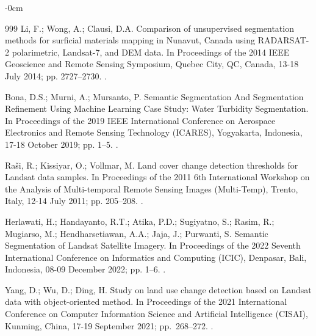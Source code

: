 \documentclass[analytics,article,accept,pdftex,moreauthors]{Definitions/mdpi}
\begin{document}
\begin{adjustwidth}{-\extralength}{0cm}
\begin{thebibliography}{999}
Li, F.; Wong, A.; Clausi, D.A.
\newblock Comparison of unsupervised segmentation methods for surficial
  materials mapping in Nunavut, Canada using RADARSAT-2 polarimetric,
  Landsat-7, and DEM data.
\newblock In Proceedings of the 2014 IEEE Geoscience and Remote Sensing
  Symposium, Quebec City, QC, Canada, 13-18 July 2014; pp. 2727--2730.  %
.

Bona, D.S.; Murni, A.; Mursanto, P.
\newblock Semantic Segmentation And Segmentation Refinement Using Machine
  Learning Case Study: Water Turbidity Segmentation.
\newblock In Proceedings of the 2019 IEEE International Conference on Aerospace
  Electronics and Remote Sensing Technology (ICARES), Yogyakarta, Indonesia, 17-18 October 2019; pp. 1--5.
.

\newpage  
{}
Raši, R.; Kissiyar, O.; Vollmar, M.
\newblock Land cover change detection thresholds for Landsat data samples.
\newblock In Proceedings of the 2011 6th International Workshop on the Analysis
  of Multi-temporal Remote Sensing Images (Multi-Temp), Trento, Italy, 12-14 July 2011; pp. 205--208.
.

Herlawati, H.; Handayanto, R.T.; Atika, P.D.; Sugiyatno, S.; Rasim, R.;
  Mugiarso, M.; Hendharsetiawan, A.A.; Jaja, J.; Purwanti, S.
\newblock Semantic Segmentation of Landsat Satellite Imagery.
\newblock In Proceedings of the 2022 Seventh International Conference on
  Informatics and Computing (ICIC), Denpasar, Bali, Indonesia, 08-09 December 2022; pp. 1--6.
.

Yang, D.; Wu, D.; Ding, H.
\newblock Study on land use change detection based on Landsat data with
  object-oriented method.
\newblock In Proceedings of the 2021 International Conference on Computer
  Information Science and Artificial Intelligence (CISAI), Kunming, China, 17-19 September 2021; pp.~268--272.
.


\end{thebibliography}
\end{adjustwidth}
\end{document}
